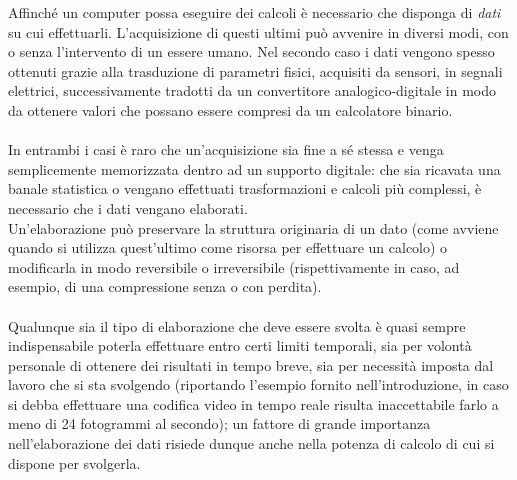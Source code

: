Affinché un computer possa eseguire dei calcoli è necessario che disponga di
\emph{dati} su cui effettuarli. L'acquisizione di questi ultimi può avvenire
in diversi modi, con o senza l'intervento di un essere umano.
Nel secondo caso i dati vengono spesso ottenuti grazie alla trasduzione 
di parametri fisici, acquisiti da sensori, in segnali elettrici, successivamente
tradotti da un convertitore analogico-digitale in modo da ottenere valori che 
possano essere compresi da un calcolatore binario.
\\ \\
In entrambi i casi è raro che un'acquisizione sia fine a sé stessa e venga
semplicemente memorizzata dentro ad un supporto digitale: che sia ricavata una
banale statistica o vengano effettuati trasformazioni e calcoli più complessi,
è necessario che i dati vengano elaborati. \\
Un'elaborazione può preservare la struttura originaria di un dato (come avviene
quando si utilizza quest'ultimo come risorsa per effettuare un calcolo) o
modificarla in modo reversibile o irreversibile (rispettivamente in caso, ad
esempio, di una compressione senza o con perdita). 
\\ \\
Qualunque sia il tipo di elaborazione che deve essere svolta è quasi sempre
indispensabile poterla effettuare entro certi limiti temporali, sia per
volontà personale di ottenere dei risultati in tempo breve, sia per
necessità imposta dal lavoro che si sta svolgendo (riportando l'esempio fornito
nell'introduzione, in caso si debba effettuare una codifica video in tempo reale
risulta inaccettabile farlo a meno di 24 fotogrammi al secondo); un fattore di
grande importanza nell'elaborazione dei dati risiede dunque anche nella potenza
di calcolo di cui si dispone per svolgerla.
